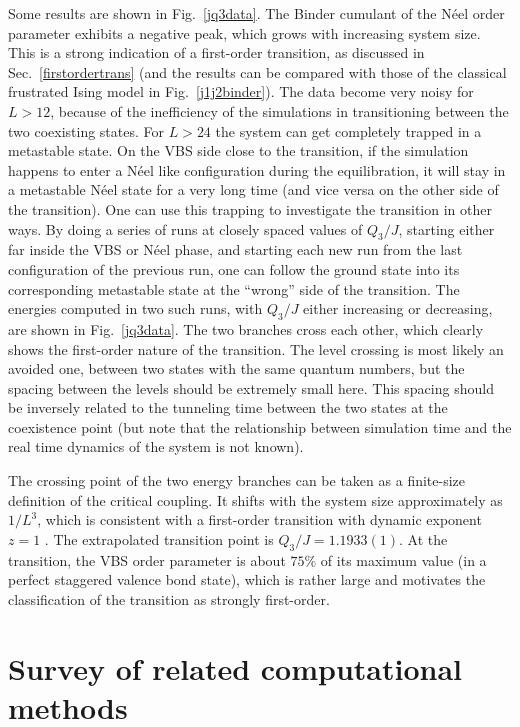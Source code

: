 \documentclass[draft,numberedheadings]{aipproc}
\begin{document}
Some results are shown in Fig.~\ref{jq3data}. The Binder cumulant of the N\'eel order parameter exhibits a negative peak, which grows
with increasing system size. This is a strong indication of a first-order transition, as discussed in Sec.~\ref{firstordertrans} (and
the results can be compared with those of the classical frustrated Ising model in Fig.~\ref{j1j2binder}). The data become very noisy for $L>12$, 
because of the inefficiency of the simulations in transitioning between the two coexisting states. 
For $L>24$ the system can get completely trapped in a metastable state. On the VBS side close to the transition, if the simulation 
happens to enter a N\'eel like configuration during the equilibration, it will stay in a metastable N\'eel state for a very long time 
(and vice versa on the other side of the transition). One can use this trapping to investigate the transition in other ways. By doing
a series of runs at closely spaced values of $Q_3/J$, starting either far inside the VBS or N\'eel phase, and starting each new
run from the last configuration of the previous run, one can follow the ground state into its corresponding metastable state at the
``wrong'' side of the transition. The energies computed in two such runs, with $Q_3/J$ either increasing or decreasing, are shown
in Fig.~\ref{jq3data}. The two branches cross each other, which clearly shows the first-order nature of the transition. The level
crossing is most likely an avoided one, between two states with the same quantum numbers, but the spacing between the levels should
be extremely small here. This spacing should be inversely related to the tunneling time between the two states at the coexistence 
point (but note that the relationship between simulation time and the real time dynamics of the system is not known). 

The crossing point of the two energy branches can be taken as a finite-size definition of the critical coupling. It shifts with the 
system size approximately as $1/L^3$, which is consistent with a first-order transition with dynamic exponent $z=1$ \cite{continentino}. 
The extrapolated transition point is $Q_3/J=1.1933(1)$. At the transition, the VBS order parameter is about $75\%$ of its maximum
value (in a perfect staggered valence bond state), which is rather large and motivates the classification of the transition as strongly
first-order.





\section{Survey of related computational methods}
\label{sec_survey}
\end{document}
